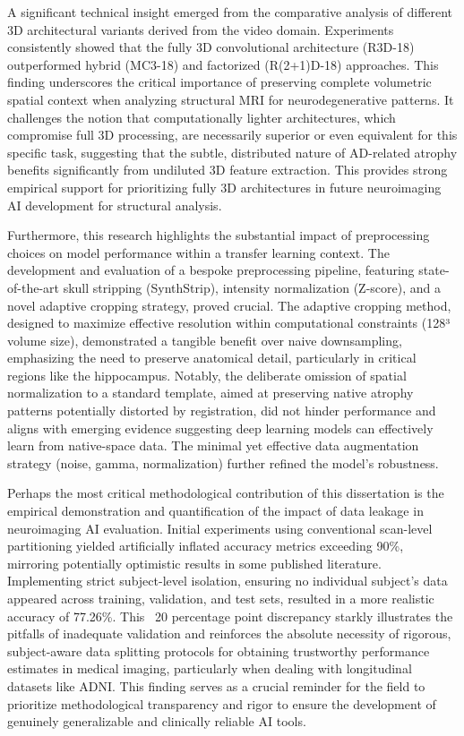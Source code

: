 \documentclass[11pt, a4paper]{article}
\begin{document}
A significant technical insight emerged from the comparative analysis of different 3D architectural variants derived from the video domain. Experiments consistently showed that the fully 3D convolutional architecture (R3D-18) outperformed hybrid (MC3-18) and factorized (R(2+1)D-18) approaches. This finding underscores the critical importance of preserving complete volumetric spatial context when analyzing structural MRI for neurodegenerative patterns. It challenges the notion that computationally lighter architectures, which compromise full 3D processing, are necessarily superior or even equivalent for this specific task, suggesting that the subtle, distributed nature of AD-related atrophy benefits significantly from undiluted 3D feature extraction. This provides strong empirical support for prioritizing fully 3D architectures in future neuroimaging AI development for structural analysis.

Furthermore, this research highlights the substantial impact of preprocessing choices on model performance within a transfer learning context. The development and evaluation of a bespoke preprocessing pipeline, featuring state-of-the-art skull stripping (SynthStrip), intensity normalization (Z-score), and a novel adaptive cropping strategy, proved crucial. The adaptive cropping method, designed to maximize effective resolution within computational constraints (128³ volume size), demonstrated a tangible benefit over naive downsampling, emphasizing the need to preserve anatomical detail, particularly in critical regions like the hippocampus. Notably, the deliberate omission of spatial normalization to a standard template, aimed at preserving native atrophy patterns potentially distorted by registration, did not hinder performance and aligns with emerging evidence suggesting deep learning models can effectively learn from native-space data. The minimal yet effective data augmentation strategy (noise, gamma, normalization) further refined the model's robustness.

Perhaps the most critical methodological contribution of this dissertation is the empirical demonstration and quantification of the impact of data leakage in neuroimaging AI evaluation. Initial experiments using conventional scan-level partitioning yielded artificially inflated accuracy metrics exceeding 90\%, mirroring potentially optimistic results in some published literature. Implementing strict subject-level isolation, ensuring no individual subject's data appeared across training, validation, and test sets, resulted in a more realistic accuracy of 77.26\%. This ~20 percentage point discrepancy starkly illustrates the pitfalls of inadequate validation and reinforces the absolute necessity of rigorous, subject-aware data splitting protocols for obtaining trustworthy performance estimates in medical imaging, particularly when dealing with longitudinal datasets like ADNI. This finding serves as a crucial reminder for the field to prioritize methodological transparency and rigor to ensure the development of genuinely generalizable and clinically reliable AI tools.
\end{document}
